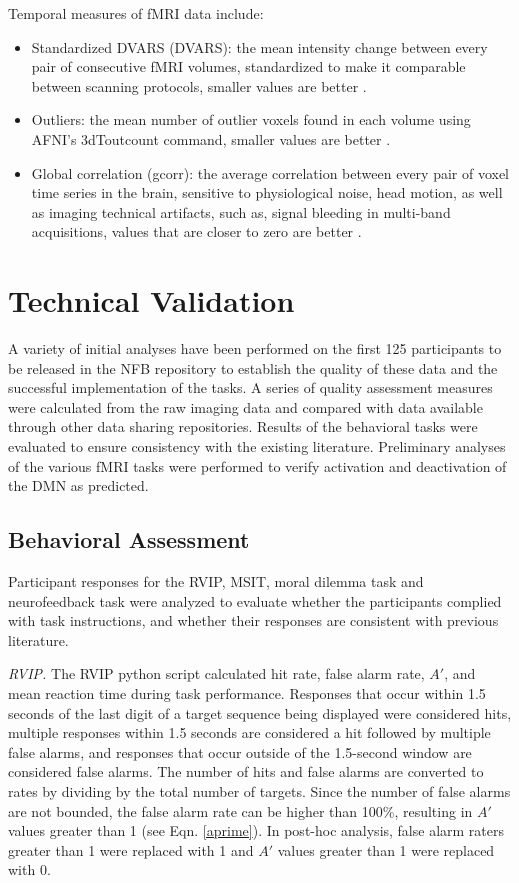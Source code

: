 Temporal measures of fMRI data include:

\begin{itemize}
    \item Standardized DVARS (DVARS): the mean intensity change between every pair of consecutive fMRI volumes, standardized to make it comparable between scanning protocols, smaller values are better \cite{Nichols2012}.
    \item Outliers: the mean number of outlier voxels found in each volume using AFNI’s 3dToutcount command, smaller values are better \cite{Cox1996}.
    \item Global correlation (gcorr): the average correlation between every pair of voxel time series in the brain, sensitive to physiological noise, head motion, as well as imaging technical artifacts, such as, signal bleeding in multi-band acquisitions, values that are closer to zero are better \cite{Saad2013}.
\end{itemize}

\section{Technical Validation}
A variety of initial analyses have been performed on the first 125 participants to be released in the NFB repository to establish the quality of these data and the successful implementation of the tasks. A series of quality assessment measures were calculated from the raw imaging data and compared with data available through other data sharing repositories. Results of the behavioral tasks were evaluated to ensure consistency with the existing literature. Preliminary analyses of the various fMRI tasks were performed to verify activation and deactivation of the DMN as predicted.

\subsection{Behavioral Assessment}
Participant responses for the RVIP, MSIT, moral dilemma task and neurofeedback task were analyzed to evaluate whether the participants complied with task instructions, and whether their responses are consistent with previous literature.

\emph{RVIP.} The RVIP python script calculated hit rate, false alarm rate, $A'$, and mean reaction time during task performance. Responses that occur within 1.5 seconds of the last digit of a target sequence being displayed were considered hits, multiple responses within 1.5 seconds are considered a hit followed by multiple false alarms, and responses that occur outside of the 1.5-second window are considered false alarms. The number of hits and false alarms are converted to rates by dividing by the total number of targets. Since the number of false alarms are not bounded, the false alarm rate can be higher than 100\%, resulting in $A'$ values greater than 1 (see Eqn. \ref{aprime}). In post-hoc analysis, false alarm raters greater than 1 were replaced with 1 and $A'$ values greater than 1 were replaced with 0.

